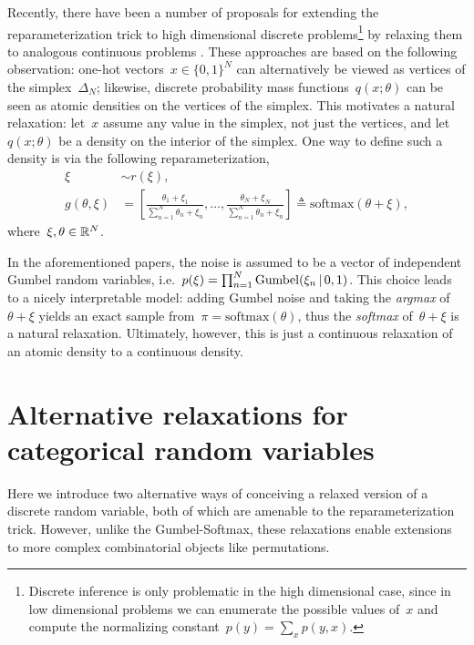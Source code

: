 Recently, there have been a number of proposals for extending the
reparameterization trick to high dimensional discrete
problems\footnote{Discrete inference is only problematic in the high
  dimensional case, since in low dimensional problems we can enumerate
  the possible values of~$x$ and compute the normalizing
  constant~$p(y) = \sum_x p(y, x)$.} by relaxing them to analogous
continuous problems \citep{maddison2016concrete, jang2016categorical,
  kusner2016gans}.  These approaches are based on the following
observation: one-hot vectors~$x \in \{0,1\}^N$ can alternatively be
viewed as vertices of the simplex~$\Delta_N$; likewise, discrete
probability mass functions~$q(x; \theta)$ can be seen as atomic
densities on the vertices of the simplex.  This motivates a natural
relaxation: let~$x$ assume any value in the simplex, not just the
vertices, and let~$q(x; \theta)$ be a density on the interior of the
simplex.  One way to define such a density is via the following
reparameterization,
\begin{align}
  \xi &\sim r(\xi), \\
  g(\theta, \xi) &= \left[ \frac{\theta_1 + \xi_1}{\sum_{n=1}^N \theta_n + \xi_n},
      \ldots,
      \frac{\theta_N + \xi_N}{\sum_{n=1}^N \theta_n + \xi_n}
      \right]
    \triangleq \mathrm{softmax}(\theta + \xi),
\end{align}
where~${\xi, \theta \in \mathbb{R}^N}$.  

In the aforementioned papers, the noise is assumed to be a vector of
independent Gumbel random variables,
i.e.~${p(\xi) = \prod_{n=1}^N \mathrm{Gumbel}(\xi_n \, | \, 0, 1)}$.
This choice leads to a nicely interpretable model: adding Gumbel noise
and taking the \emph{argmax} of~$\theta + \xi$ yields an exact sample from~$\pi = \mathrm{softmax}(\theta)$, thus
the \emph{softmax} of~$\theta + \xi$ is a natural relaxation. Ultimately,
however, this is just a continuous relaxation of an atomic density to
a continuous density.

\section{Alternative relaxations for categorical random variables}
\label{sec:alternative}
Here we introduce two alternative ways of conceiving a relaxed version
of a discrete random variable, both of which are amenable to the
reparameterization trick. However, unlike the Gumbel-Softmax, these
relaxations enable extensions to more complex combinatorial objects
like permutations.

